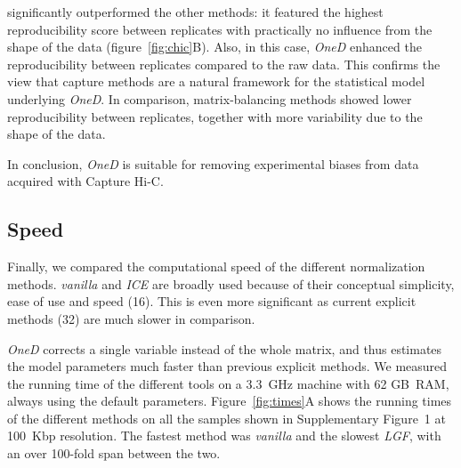 \documentclass[a4,center,fleqn]{NAR}
\providecommand{\DIFadd}[1]{{\protect\color{red}#1}} %
\providecommand{\DIFdel}[1]{{\protect}}                      %
\providecommand{\DIFaddbegin}{} %
\providecommand{\DIFaddend}{} %
\providecommand{\DIFdelbegin}{} %
\providecommand{\DIFdelend}{} %
\begin{document}
\DIFdel{In summary,
}\DIFdelend \DIFaddbegin \DIFadd{significantly
outperformed the other methods: it featured the highest reproducibility
score between replicates with practically no influence from the shape of
the data (figure~\ref{fig:chic}B). Also, in this case, }\DIFaddend \textit{OneD}
\DIFdelbegin \DIFdel{can be used to obtain an euploid-equivalent
normalized matrix in cases where the effect of the copy number must be
removed from the signal}\DIFdelend \DIFaddbegin \DIFadd{enhanced the reproducibility between replicates compared to the raw data.
This confirms the view that capture methods are a natural framework for
the statistical model underlying }\textit{\DIFadd{OneD}}\DIFadd{. In comparison,
matrix-balancing methods showed lower reproducibility between replicates,
together with more variability due to the shape of the data.
}

\DIFadd{In conclusion, }\textit{\DIFadd{OneD}} \DIFadd{is suitable for removing experimental biases
from data acquired with Capture Hi-C}\DIFaddend .

\subsection{Speed}

Finally, we compared the computational speed of the different
normalization methods. \textit{vanilla} and \textit{ICE} \DIFdelbegin \DIFdel{have broad
acceptance for }\DIFdelend \DIFaddbegin \DIFadd{are broadly used
because of }\DIFaddend their conceptual simplicity, ease of use and speed
(16). This is even more significant as current
explicit methods (\DIFdelbegin \DIFdel{33}\DIFdelend \DIFaddbegin \DIFadd{32}\DIFaddend ) are much slower in comparison.

\DIFdelbegin \DIFdel{Unlike the other methods, }\DIFdelend \textit{OneD} corrects a single variable instead of the whole matrix, and
thus estimates the model parameters much faster than previous explicit
methods. We measured the running time of the different tools on a 3.3~GHz
machine with 62 GB~RAM, always using the default parameters.
Figure~\ref{fig:times}A shows the running times of the different methods
on \DIFdelbegin \DIFdel{the samples described in Table~\ref{tab:samples} }\DIFdelend \DIFaddbegin \DIFadd{all the samples shown in Supplementary Figure~1 }\DIFaddend at 100\DIFdelbegin \DIFdel{kbp }\DIFdelend \DIFaddbegin \DIFadd{~Kbp }\DIFaddend resolution.
The fastest method was \textit{vanilla} and the slowest \DIFdelbegin \DIFdel{is }\DIFdelend \textit{LGF}, with
an over 100-fold span between the two.
\end{document}
